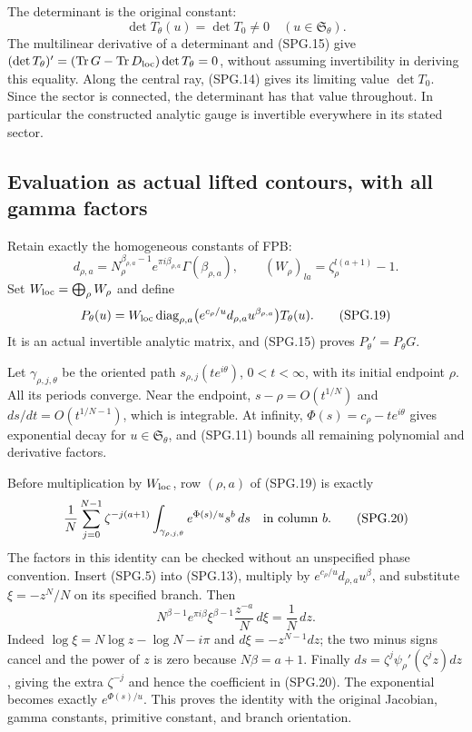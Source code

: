 The determinant is the original constant:
\[
 \det T_\theta(u)=\det T_0\ne0
                 \quad(u\in\mathfrak S_\theta).
 \tag{SPG.17}\label{GraphV2:eq:spg-determinant}
\]
The multilinear derivative of a determinant and (SPG.15) give
\((\det T_\theta)'=(\operatorname{Tr}G-
\operatorname{Tr}D_{\rm loc})\det T_\theta=0\), without assuming
invertibility in deriving this equality. Along the central ray,
(SPG.14) gives its limiting value \(\det T_0\). Since the sector
is connected, the determinant has that value throughout. In
particular the constructed analytic gauge is invertible everywhere
in its stated sector.

\subsection{Evaluation as actual lifted contours, with all gamma factors}

Retain exactly the homogeneous constants of FPB:
\[
 d_{\rho,a}=N_\rho^{\beta_{\rho,a}-1}
           e^{\pi i\beta_{\rho,a}}\Gamma(\beta_{\rho,a}),
 \qquad (W_\rho)_{la}=\zeta_\rho^{l(a+1)}-1.
 \tag{SPG.18}\label{GraphV2:eq:spg-gamma}
\]
Set \(W_{\rm loc}=\bigoplus_\rho W_\rho\) and define
\[
 P_\theta(u)=W_{\rm loc}
    \operatorname{diag}_{\rho,a}
       \bigl(e^{c_\rho/u}d_{\rho,a}u^{\beta_{\rho,a}}\bigr)
                      T_\theta(u).
 \tag{SPG.19}\label{GraphV2:eq:spg-period-matrix}
\]
It is an actual invertible analytic matrix, and (SPG.15) proves
\(P_\theta'=P_\theta G\).

Let \(\gamma_{\rho,j,\theta}\) be the oriented path
\(s_{\rho,j}(t e^{i\theta})\), \(0<t<\infty\), with its
initial endpoint \(\rho\). All its periods converge. Near the
endpoint, \(s-\rho=O(t^{1/N})\) and
\(ds/dt=O(t^{1/N-1})\), which is integrable. At infinity,
\(\Phi(s)=c_\rho-t e^{i\theta}\) gives exponential decay for
\(u\in\mathfrak S_\theta\), and (SPG.11) bounds all remaining
polynomial and derivative factors.

Before multiplication by \(W_{\rm loc}\), row \((\rho,a)\)
of (SPG.19) is exactly
\[
 \frac1N\sum_{j=0}^{N-1}\zeta^{-j(a+1)}
       \int_{\gamma_{\rho,j,\theta}}e^{\Phi(s)/u}s^b\,ds
                 \quad\hbox{in column }b.
 \tag{SPG.20}\label{GraphV2:eq:spg-Fourier-contour}
\]
The factors in this identity can be checked without an unspecified
phase convention. Insert (SPG.5) into (SPG.13), multiply by
\(e^{c_\rho/u}d_{\rho,a}u^\beta\), and substitute
\(\xi=-z^N/N\) on its specified branch. Then
\[
 N^{\beta-1}e^{\pi i\beta}
   \xi^{\beta-1}\frac{z^{-a}}N\,d\xi
          =\frac1N\,dz.
\]
Indeed \(\log\xi=N\log z-\log N-i\pi\) and
\(d\xi=-z^{N-1}dz\); the two minus signs cancel and the power
of \(z\) is zero because \(N\beta=a+1\).
Finally \(ds=\zeta^j\psi_\rho'(\zeta^jz)dz\), giving the
extra \(\zeta^{-j}\) and hence the coefficient in (SPG.20).
The exponential becomes exactly \(e^{\Phi(s)/u}\). This proves
the identity with the original Jacobian, gamma constants, primitive
constant, and branch orientation.

